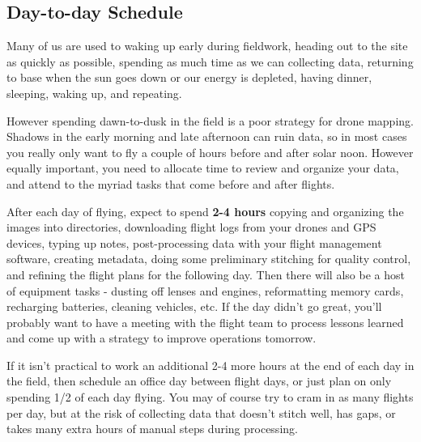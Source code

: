 \documentclass[
]{book}
\begin{document}
\hypertarget{day-to-day-schedule}{%
\subsection{Day-to-day Schedule}\label{day-to-day-schedule}}

Many of us are used to waking up early during fieldwork, heading out to the site as quickly as possible, spending as much time as we can collecting data, returning to base when the sun goes down or our energy is depleted, having dinner, sleeping, waking up, and repeating.

However spending dawn-to-dusk in the field is a poor strategy for drone mapping. Shadows in the early morning and late afternoon can ruin data, so in most cases you really only want to fly a couple of hours before and after solar noon. However equally important, you need to allocate time to review and organize your data, and attend to the myriad tasks that come before and after flights.

After each day of flying, expect to spend \textbf{2-4 hours} copying and organizing the images into directories, downloading flight logs from your drones and GPS devices, typing up notes, post-processing data with your flight management software, creating metadata, doing some preliminary stitching for quality control, and refining the flight plans for the following day. Then there will also be a host of equipment tasks - dusting off lenses and engines, reformatting memory cards, recharging batteries, cleaning vehicles, etc. If the day didn't go great, you'll probably want to have a meeting with the flight team to process lessons learned and come up with a strategy to improve operations tomorrow.

If it isn't practical to work an additional 2-4 more hours at the end of each day in the field, then schedule an office day between flight days, or just plan on only spending 1/2 of each day flying. You may of course try to cram in as many flights per day, but at the risk of collecting data that doesn't stitch well, has gaps, or takes many extra hours of manual steps during processing.
\end{document}
